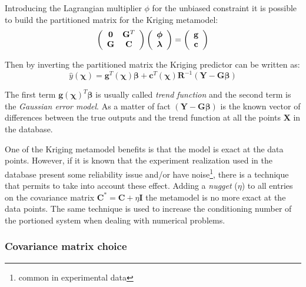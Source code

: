 Introducing the Lagrangian multiplier $\phi$ for the unbiased constraint it is possible to build the partitioned matrix for the Kriging metamodel:
\begin{equation}
\left(
\begin{array}{c c}
\mathbf{0} & \mathbf{G}^T \\
\mathbf{G} & \mathbf{C}
\end{array}
\right)  \left( 
\begin{array}{c}
\boldsymbol{\phi} \\
\boldsymbol{\lambda}
\end{array}
\right) = \left( 
\begin{array}{c}
\mathbf{g} \\
\mathbf{c}
\end{array}
\right)
\end{equation}

Then by inverting the partitioned matrix the Kriging predictor can be written as:
\begin{equation}
\hat{y}(\boldsymbol{\chi}) = \mathbf{g}^T(\boldsymbol{\chi}) \boldsymbol{\beta} + \mathbf{c}^T(\boldsymbol{\chi}) \mathbf{R}^{-1} \left( \mathbf{Y} - \mathbf{G}\boldsymbol{\beta} \right)
\end{equation}

The first term $\mathbf{g}(\boldsymbol{\chi})^T \boldsymbol{\beta}$ is usually called \textit{trend function} and the second term is the \textit{Gaussian error model}. As a matter of fact $\left( \mathbf{Y} - \mathbf{G}\boldsymbol{\beta} \right)$ is the known vector of differences between the true outputs and the trend function at all the points $\mathbf{X}$ in the database.

One of the Kriging metamodel benefits is that the model is exact at the data points. However, if it is known that the experiment realization used in the database present some reliability issue and/or have noise\footnote{common in experimental data}, there is a technique that permits to take into account these effect.
Adding a \textit{nugget} ($\eta$) to all entries on the covariance matrix $\mathbf{C}^* = \mathbf{C} + \eta \mathbf{I}$ the metamodel is no more exact at the data points. The same technique is used to increase the conditioning number of the portioned system when dealing with numerical problems.

\subsubsection{Covariance matrix choice}
\label{sec:cov}

